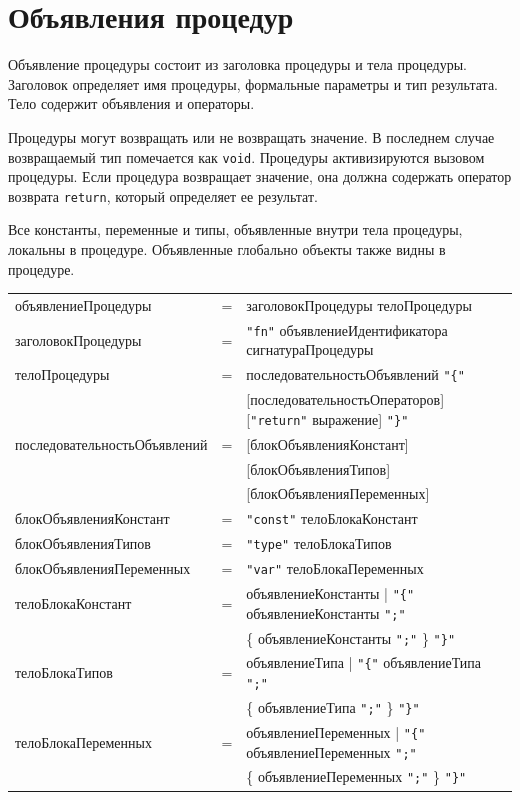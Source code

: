 \documentclass[a4paper,12pt]{article}
\newcommand{\lit}[1]{\texttt{"#1"}}
\begin{document}
    \section{Объявления процедур}

    Объявление процедуры состоит из заголовка процедуры и тела процедуры. Заголовок определяет имя процедуры, формальные параметры и тип результата. Тело содержит объявления и операторы.

    Процедуры могут возвращать или не возвращать значение. В последнем случае возвращаемый тип помечается как \texttt{void}. Процедуры активизируются вызовом процедуры. Если процедура возвращает значение, она должна содержать оператор возврата \texttt{return}, который определяет ее результат.

    Все константы, переменные и типы, объявленные внутри тела процедуры, локальны в процедуре. Объявленные глобально объекты также видны в процедуре.

    \begin{center}
        \begin{tabular}{l c l}
            объявлениеПроцедуры & = & заголовокПроцедуры телоПроцедуры \\
            заголовокПроцедуры & = & \lit{fn} объявлениеИдентификатора сигнатураПроцедуры \\
            телоПроцедуры & = & последовательностьОбъявлений \lit{\{} \\
            & & [последовательностьОператоров] [\lit{return} выражение] \lit{\}} \\
            последовательностьОбъявлений & = & [блокОбъявленияКонстант] \\
            & & [блокОбъявленияТипов] \\
            & & [блокОбъявленияПеременных] \\
            блокОбъявленияКонстант & = & \lit{const} телоБлокаКонстант \\
            блокОбъявленияТипов & = & \lit{type} телоБлокаТипов \\
            блокОбъявленияПеременных & = & \lit{var} телоБлокаПеременных \\
            телоБлокаКонстант & = & объявлениеКонстанты | \lit{\{} объявлениеКонстанты \lit{;} \\
            & & \{ объявлениеКонстанты \lit{;} \} \lit{\}} \\
            телоБлокаТипов & = & объявлениеТипа | \lit{\{} объявлениеТипа \lit{;} \\
            & & \{ объявлениеТипа \lit{;} \} \lit{\}} \\
            телоБлокаПеременных & = & объявлениеПеременных | \lit{\{} объявлениеПеременных \lit{;} \\
            & & \{ объявлениеПеременных \lit{;} \} \lit{\}} \\
        \end{tabular}
    \end{center}
\end{document}
